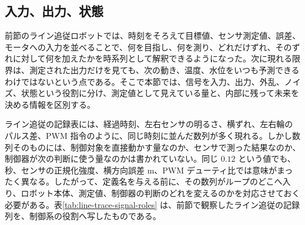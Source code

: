 \subsection{入力、出力、状態}

前節のライン追従ロボットでは、時刻をそろえて目標値、センサ測定値、誤差、モータへの入力を並べることで、何を目指し、何を測り、どれだけずれ、そのずれに対して何を加えたかを時系列として解釈できるようになった。次に現れる限界は、測定された出力だけを見ても、次の動き、温度、水位をいつも予測できるわけではないという点である。そこで本節では、信号を入力、出力、外乱、ノイズ、状態という役割に分け、測定値として見えている量と、内部に残って未来を決める情報を区別する。

ライン追従の記録表には、経過時刻、左右センサの明るさ、横ずれ、左右輪のパルス差、PWM 指令のように、同じ時刻に並んだ数列が多く現れる。しかし数列そのものには、制御対象を直接動かす量なのか、センサで測った結果なのか、制御器が次の判断に使う量なのかは書かれていない。同じ $0.12$ という値でも、秒、センサの正規化強度、横方向誤差 m、PWM デューティ比では意味がまったく異なる。したがって、定義名を与える前に、その数列がループのどこへ入り、ロボット本体、測定値、制御器の判断のどれを変えるのかを対応させておく必要がある。表\ref{tab:line-trace-signal-roles} は、前節で観察したライン追従の記録列を、制御系の役割へ写したものである。


